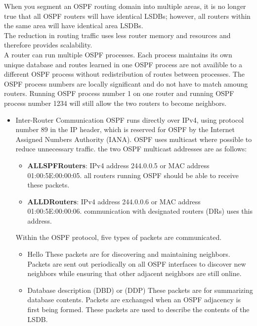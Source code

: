 \documentclass{article}
\begin{document}
\begin{itemize}
		When you segment an OSPF routing domain into multiple areas, it is no longer true that all OSPF routers will have identical LSDBs; however, all routers within the same area will have identical area LSDBs.\\
		The reduction in routing traffic uses less router memory and resources and therefore provides scalability.\\

		A router can run multiple OSPF processes. Each process maintains its own unique database and routes learned in one OSPF process are not availible to a different OSPF process without redistribution of routes between processes. The OSPF process numbers are locally significant and do not have to match amoung routers. Running OSPF process number 1 on one router and running OSPF process number 1234 will still allow the two routers to become neighbors.\\

		\begin{itemize}
			\item Inter-Router Communication
				OSPF runs directly over IPv4, using protocol number 89 in the IP header, which is reserved for OSPF by the Internet Assigned Numbers Authority (IANA). OSPF uses multicast where possible to reduce unnecessary traffic. the two OSPF multicast addresses are as follows:
				\begin{itemize}
					\item \textbf{ALLSPFRouters}: IPv4 address 244.0.0.5 or MAC address 01:00:5E:00:00:05. all routers running OSPF should be able to receive these packets.
					\item \textbf{ALLDRouters}: IPv4 address 244.0.0.6 or MAC address 01:00:5E:00:00:06. communication with designated routers (DRs) uses this address.
				\end{itemize}

				Within the OSPF protocol, five types of packets are communicated.
				\begin{itemize}
					\item Hello
						These packets are for discovering and maintaining neighbors. Packets are sent out periodically on all OSPF interfaces to discover new neighbors while ensuring that other adjacent neighbors are still online.

					\item Database description (DBD) or (DDP)
						These packets are for summarizing database contents. Packets are exchanged when an OSPF adjacency is first being formed. These packets are used to describe the contents of the LSDB.


\end{itemize}
\end{itemize}
\end{itemize}
\end{document}
